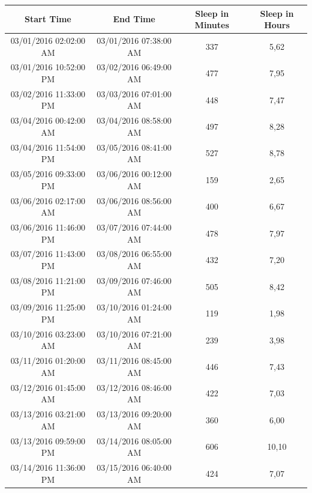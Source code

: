 \documentclass[12pt]{article} %
\begin{document}
\begin{table}[H]
\center
\begin{footnotesize}
	\begin{tabular}{| c | c | c | c |}
	\hline
	\textbf{Start Time} & \textbf{End Time} & \textbf{Sleep in Minutes} & \textbf{Sleep in Hours} \\
	\hline
03/01/2016 02:02:00 AM & 03/01/2016 07:38:00 AM & 337 & 5,62\\
\hline
03/01/2016 10:52:00 PM & 03/02/2016 06:49:00 AM & 477 & 7,95\\
\hline
03/02/2016 11:33:00 PM & 03/03/2016 07:01:00 AM & 448 & 7,47\\
\hline
03/04/2016 00:42:00 AM & 03/04/2016 08:58:00 AM & 497 & 8,28\\
\hline
03/04/2016 11:54:00 PM & 03/05/2016 08:41:00 AM & 527 & 8,78\\
\hline
\colorbox{blue!20}{03/05/2016 09:33:00 PM} & \colorbox{blue!20}{03/06/2016 00:12:00 AM} & \colorbox{blue!20}{159} & \colorbox{blue!20}{2,65}\\
\hline
\colorbox{blue!30}{03/06/2016 02:17:00 AM} & \colorbox{blue!30}{03/06/2016 08:56:00 AM} & \colorbox{blue!30}{400} & \colorbox{blue!30}{6,67}\\
\hline
\colorbox{blue!30}{03/06/2016 11:46:00 PM} & \colorbox{blue!30}{03/07/2016 07:44:00 AM} & \colorbox{blue!30}{478} & \colorbox{blue!30}{7,97}\\
\hline
03/07/2016 11:43:00 PM & 03/08/2016 06:55:00 AM & 432 & 7,20\\
\hline
03/08/2016 11:21:00 PM & 03/09/2016 07:46:00 AM & 505 & 8,42\\
\hline
03/09/2016 11:25:00 PM & 03/10/2016 01:24:00 AM & 119 & 1,98\\
\hline
03/10/2016 03:23:00 AM & 03/10/2016 07:21:00 AM & 239 & 3,98\\
\hline
03/11/2016 01:20:00 AM & 03/11/2016 08:45:00 AM & 446 & 7,43\\
\hline
\colorbox{blue!20}{03/12/2016 01:45:00 AM} & \colorbox{blue!20}{03/12/2016 08:46:00 AM} & \colorbox{blue!20}{422} & \colorbox{blue!20}{7,03}\\
\hline
\colorbox{blue!30}{03/13/2016 03:21:00 AM} & \colorbox{blue!30}{03/13/2016 09:20:00 AM} & \colorbox{blue!30}{360} & \colorbox{blue!30}{6,00}\\
\hline
\colorbox{blue!30}{03/13/2016 09:59:00 PM} & \colorbox{blue!30}{03/14/2016 08:05:00 AM} & \colorbox{blue!30}{606} & \colorbox{blue!30}{10,10}\\
\hline
03/14/2016 11:36:00 PM & 03/15/2016 06:40:00 AM	& 424 & 7,07\\

\end{tabular}
\end{footnotesize}
\end{table}
\end{document}
